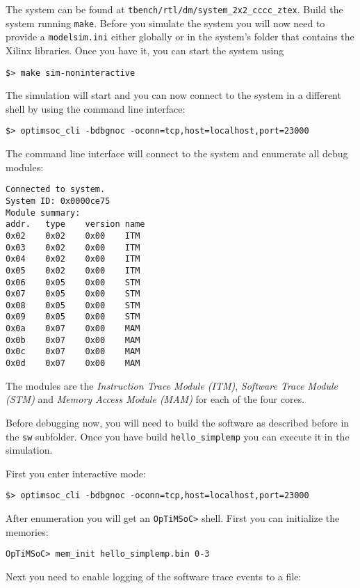 The system can be found at \verb|tbench/rtl/dm/system_2x2_cccc_ztex|.
Build the system running \verb|make|. Before you simulate the system
you will now need to provide a \verb|modelsim.ini| either globally or
in the system's folder that contains the Xilinx libraries. Once you
have it, you can start the system using

\begin{lstlisting}
$> make sim-noninteractive
\end{lstlisting}

The simulation will start and you can now connect
to the system in a different shell by using the command line
interface:

\begin{lstlisting}
$> optimsoc_cli -bdbgnoc -oconn=tcp,host=localhost,port=23000
\end{lstlisting}

The command line interface will connect to the system and enumerate
all debug modules:

\begin{lstlisting}
Connected to system.
System ID: 0x0000ce75
Module summary:
addr.	type	version	name
0x02	0x02	0x00	ITM
0x03	0x02	0x00	ITM
0x04	0x02	0x00	ITM
0x05	0x02	0x00	ITM
0x06	0x05	0x00	STM
0x07	0x05	0x00	STM
0x08	0x05	0x00	STM
0x09	0x05	0x00	STM
0x0a	0x07	0x00	MAM
0x0b	0x07	0x00	MAM
0x0c	0x07	0x00	MAM
0x0d	0x07	0x00	MAM
\end{lstlisting}

The modules are the \emph{Instruction Trace Module (ITM)},
\emph{Software Trace Module (STM)} and \emph{Memory Access Module
  (MAM)} for each of the four cores.

Before debugging now, you will need to build the software as described
before in the \verb|sw| subfolder. Once you have build
\verb|hello_simplemp| you can execute it in the simulation.

First you enter interactive mode:

\begin{lstlisting}
$> optimsoc_cli -bdbgnoc -oconn=tcp,host=localhost,port=23000
\end{lstlisting}

After enumeration you will get an \verb|OpTiMSoC>| shell. First you
can initialize the memories:

\begin{lstlisting}
OpTiMSoC> mem_init hello_simplemp.bin 0-3
\end{lstlisting}

Next you need to enable logging of the software trace events to a
file:


